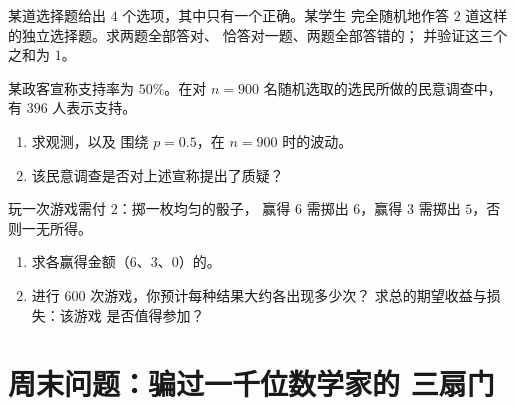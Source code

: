 \begin{exercise}[$\star\star$]\label{exo:g10:proba:7}
某道选择题给出 $4$ 个选项，其中只有一个正确。某学生
完全随机地作答 $2$ 道这样的独立选择题。求两题全部答对、
恰答对一题、两题全部答错的；
并验证这三个之和为 $1$。
\end{exercise}

\begin{exercise}[$\star\star$]\label{exo:g10:proba:8}
某政客宣称支持率为 $50\%$。在对 $n = 900$ 名随机选取的选民所做的民意调查中，
有 $396$ 人表示支持。
\begin{enumerate}
  \item 求观测，以及
        围绕 $p = 0.5$，在 $n = 900$ 时的波动。
  \item 该民意调查是否对上述宣称提出了质疑？
\end{enumerate}
\end{exercise}

\begin{exercise}[$\star\star\star$]\label{exo:g10:proba:9}
玩一次游戏需付 $2$：掷一枚均匀的骰子，
赢得 $6$ 需掷出 $6$，赢得 $3$ 需掷出 $5$，否则一无所得。
\begin{enumerate}
  \item 求各赢得金额（$6$、$3$、$0$）的。
  \item 进行 $600$ 次游戏，你预计每种结果大约各出现多少次？
        求总的期望收益与损失：该游戏
        是否值得参加？
\end{enumerate}
\end{exercise}

\section{周末问题：骗过一千位数学家的
三扇门}

